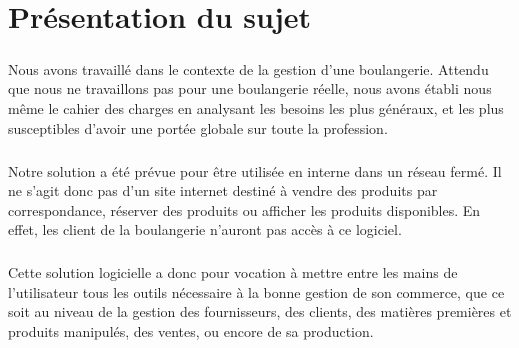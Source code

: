 \chapter{Présentation du sujet}

\paragraph{}
    Nous avons travaillé dans le contexte de la gestion d'une boulangerie.
    Attendu que nous ne travaillons pas pour une boulangerie réelle, nous avons
    établi nous même le cahier des charges en analysant les besoins les plus
    généraux, et les plus susceptibles d'avoir une portée globale sur toute
    la profession.
\paragraph{}
    Notre solution a été prévue pour être utilisée en interne dans un réseau
    fermé. Il ne s'agit donc pas d'un site internet destiné à vendre des
    produits par correspondance, réserver des produits ou afficher les produits
    disponibles. En effet, les client de la boulangerie n'auront pas accès à ce
    logiciel.
\paragraph{}
    Cette solution logicielle a donc pour vocation à mettre entre les mains de 
    l'utilisateur tous les outils nécessaire à la bonne gestion de son
    commerce, que ce soit au niveau de la gestion des fournisseurs, des
    clients, des matières premières et produits manipulés, des ventes,
    ou encore de sa production.